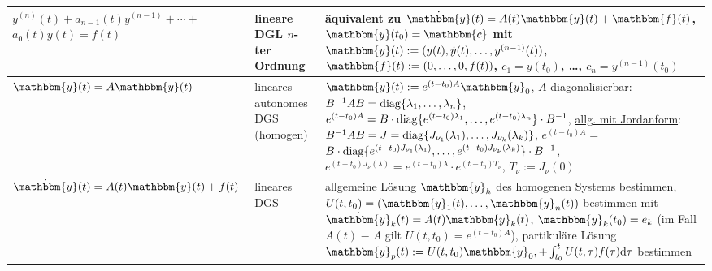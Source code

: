 \begin{landscape}
\begin{tabular}{p{50mm}p{50mm}p{148mm}}
        \midrule

        $y^{(n)}(t) + a_{n-1}(t) y^{(n-1)} + \dotsb +$ \newline
        $a_0(t) y(t) = f(t)$ &
        lineare DGL \newline
        $n$-ter Ordnung &
        äquivalent zu
        $\dot{\mathbbm{y}}(t) = A(t) \mathbbm{y}(t) + \mathbbm{f}(t)$,
        $\mathbbm{y}(t_0) = \mathbbm{c}$ mit
        $\mathbbm{y}(t) := (y(t), \dot{y}(t), \dotsc, y^{(n-1)}(t))$, \newline
        $\mathbbm{f}(t) := (0, \dotsc, 0, f(t))$,
        $c_1 = y(t_0)$, \dots, $c_n = y^{(n-1)}(t_0)$ \\

        \midrule

        $\dot{\mathbbm{y}}(t) = A \mathbbm{y}(t)$ &
        lineares autonomes DGS \newline
        (homogen) &
        $\mathbbm{y}(t) := e^{(t - t_0)A} \mathbbm{y}_0$, \newline
        \underline{$A$ diagonalisierbar}:
        $B^{-1} A B = \operatorname{diag}\{\lambda_1, \dotsc, \lambda_n\}$,
        $e^{(t - t_0)A} = B \cdot \operatorname{diag}\{e^{(t - t_0)\lambda_1}, \dotsc,
        e^{(t - t_0)\lambda_n}\} \cdot B^{-1}$, \newline
        \underline{allg. mit Jordanform}:
        $B^{-1} A B = J = \operatorname{diag}\{J_{\nu_1}(\lambda_1), \dotsc,
        J_{\nu_k}(\lambda_k)\}$,
        $e^{(t - t_0)A} =$ \newline
        $B \cdot \operatorname{diag}\{e^{(t - t_0)J_{\nu_1}(\lambda_1)},
        \dotsc, e^{(t - t_0)J_{\nu_k}(\lambda_k)}\} \cdot B^{-1}$,
        $e^{(t - t_0)J_\nu(\lambda)} =
        e^{(t - t_0)\lambda} \cdot e^{(t - t_0)T_\nu}$,
        $T_\nu := J_\nu(0)$ \\

        \midrule

        $\dot{\mathbbm{y}}(t) = A(t) \mathbbm{y}(t) + f(t)$ &
        lineares DGS &
        allgemeine Lösung $\mathbbm{y}_h$ des homogenen Systems bestimmen,
        $U(t, t_0) = (\mathbbm{y}_1(t), \dots, \mathbbm{y}_n(t))$
        bestimmen mit $\dot{\mathbbm{y}}_k(t) = A(t) \mathbbm{y}_k(t)$,
        $\mathbbm{y}_k(t_0) = e_k$
        (im Fall $A(t) \equiv A$ gilt $U(t, t_0) = e^{(t - t_0)A}$), \newline
        partikuläre Lösung $\mathbbm{y}_p(t) := U(t, t_0)\mathbbm{y}_0, +
        \int_{t_0}^t U(t, \tau)f(\tau) \d\tau$ bestimmen \\

        \bottomrule
    \end{tabular}
\end{landscape}

\pagebreak
